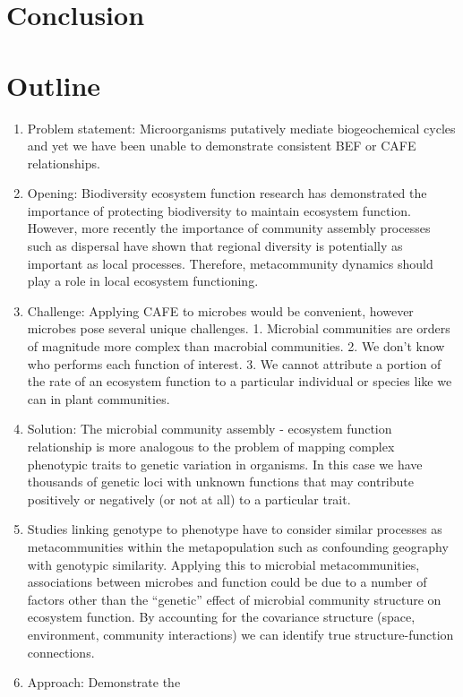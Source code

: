\documentclass{article}
\begin{document}
\section{Conclusion}

\section*{Outline} 
\begin{enumerate} 
  \item Problem statement: Microorganisms putatively mediate biogeochemical
    cycles and yet we have been unable to demonstrate consistent BEF or CAFE
  relationships.   
\item  Opening: Biodiversity ecosystem function research has demonstrated the
  importance of protecting biodiversity to maintain ecosystem function.
  However, more recently the importance of community assembly processes such as
  dispersal have shown that regional diversity is potentially as important as
  local processes. Therefore, metacommunity dynamics should play a role in local
  ecosystem functioning.  
  \item Challenge: Applying CAFE to microbes would be
  convenient, however microbes pose several unique challenges. 1. Microbial
  communities are orders of magnitude more complex than macrobial communities.
  2. We don’t know who performs each function of interest. 3. We cannot
  attribute a portion of the rate of an ecosystem function to a particular
  individual or species like we can in plant communities.  
  \item Solution: The
  microbial community assembly - ecosystem function relationship is more
  analogous to the problem of mapping complex phenotypic traits to genetic
  variation in organisms. In this case we have thousands of genetic loci with
  unknown functions that may contribute positively or negatively (or not at all)
  to a particular trait.  
  \item Studies linking genotype to phenotype have to
  consider similar processes as metacommunities within the
  metapopulation such as confounding geography with genotypic similarity.
  Applying this to microbial metacommunities, associations between microbes and
  function could be due to a number of factors other than the “genetic” effect
  of microbial community structure on ecosystem function. By accounting for the
  covariance structure (space, environment, community interactions) we can
  identify true structure-function connections.  
  \item Approach: Demonstrate the

\end{enumerate}
\end{document}
